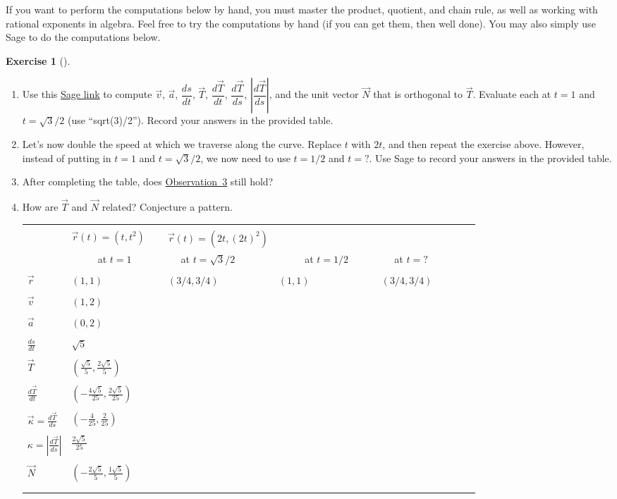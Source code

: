 \documentclass[10pt,]{book}
\theoremstyle{plain}
\theoremstyle{definition}
\theoremstyle{definition}
\theoremstyle{definition}
\theoremstyle{definition}
\newtheorem{exploration}[project]{Exercise}
\theoremstyle{definition}
\numberwithin{equation}{section}
\newcommand{\hrulethin}  {\noalign{\hrule height 0.04em}}
\newcommand{\sageurlforcurvature}{http://bmw.byuimath.com/dokuwiki/doku.php?id=curvature_calculator}
\begin{document}
\par
If you want to perform the computations below by hand, you must master the product, quotient, and chain rule, as well as working with rational exponents in algebra. Feel free to try the computations by hand (if you can get them, then well done). You may also simply use Sage to do the computations below.%
\begin{exploration}[]\label{exploration-173}
\leavevmode%
\begin{enumerate}[font=\bfseries,label=(\alph*),ref=\alph*]
\item\label{task-424} Use this \href{\\sageurlforcurvature}{Sage link} to compute \(\vec v\), \(\vec a\), \(\dfrac{ds}{dt}\), \(\vec T\), \(\dfrac{d\vec T}{dt}\), \(\dfrac{d\vec T}{ds}\), \(\left|\dfrac{d\vec T}{ds}\right|\), and the unit vector \(\vec N\) that is orthogonal to \(\vec T\). Evaluate each at \(t=1\) and \(t=\sqrt{3}/2\) (use ``sqrt(3)/2''). Record your answers in the provided table.%
\item\label{task-425} Let's now double the speed at which we traverse along the curve. Replace \(t\) with \(2t\), and then repeat the exercise above. However, instead of putting in \(t=1\) and \(t=\sqrt{3}/2\), we now need to use \(t=1/2\) and \(t=?\). Use Sage to record your answers in the provided table.%
\item\label{task-426} After completing the table, does \hyperref[curvature_observations]{Observation~3} still hold?%
\item\label{task-427} How are \(\vec T\) and \(\vec N\) related?  Conjecture a pattern. \begin{tabular}{lllll}
&&&&\tabularnewline\hrulethin
\multirow{2}{*}{Value}&\(\vec r(t)=(t,t^2)\)&\(\vec r(t)=(2t,(2t)^2)\)\tabularnewline[0pt]
&~~ ~~ at \(t=1\) ~~ ~~&~~ at \(t=\sqrt3/2\)~~ ~~&~~ ~~ at \(t=1/2\)~~ ~~&~~ at \(t=?\)~~~~~~ ~~\tabularnewline[0pt]
&&&&\tabularnewline\hrulethin
\(\vec r\)&\((1,1)\)&\((3/4,3/4)\)&\((1,1)\)&\((3/4,3/4)\)\tabularnewline[0pt]
&&&&\tabularnewline\hrulethin
\(\vec v\)&\((1,2)\)&&&\tabularnewline[0pt]
&&&&\tabularnewline\hrulethin
\(\vec a\)&\((0,2)\)&&&\tabularnewline[0pt]
&&&&\tabularnewline\hrulethin
\(\frac{ds}{dt}\)&\(\sqrt{5}\)&&&\tabularnewline[0pt]
&&&&\tabularnewline\hrulethin
\(\vec T\)&\((\frac{\sqrt{5}}{5},\frac{2\sqrt{5}}{5})\)&&&\tabularnewline[0pt]
&&&&\tabularnewline\hrulethin
\(\frac{d\vec T}{dt}\)&\((-\frac{4\sqrt{5}}{25},\frac{2\sqrt{5}}{25})\)&&&\tabularnewline[0pt]
&&&&\tabularnewline\hrulethin
\(\vec\kappa=\frac{d\vec T}{ds}\)&\((-\frac{4}{25},\frac{2}{25})\)&&&\tabularnewline[0pt]
&&&&\tabularnewline\hrulethin
\(\kappa=\left|\frac{d\vec T}{ds}\right|\)&\(\frac{2\sqrt{5}}{25}\)&&&\tabularnewline[0pt]
&&&&\tabularnewline\hrulethin
\(\vec N\)&\((-\frac{2\sqrt{5}}{5},\frac{1\sqrt{5}}{5})\)&&&\tabularnewline[0pt]
&&&&\tabularnewline\hrulethin
\end{tabular}
%
\end{enumerate}
\end{exploration}
\end{document}
